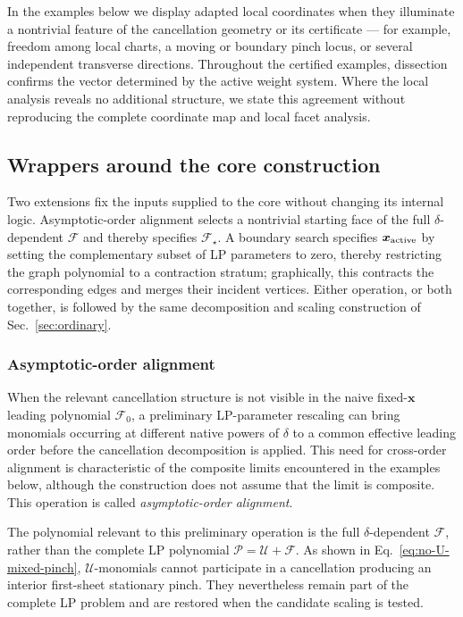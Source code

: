 \documentclass[a4paper,11pt]{article}
\newcommand{\x}{\boldsymbol{x}}
\begin{document}
In the examples below we display adapted local coordinates when they
illuminate a nontrivial feature of the cancellation geometry or its
certificate --- for example, freedom among local charts, a moving or boundary
pinch locus, or several independent transverse directions.  Throughout the
certified examples, dissection confirms the vector determined by the active
weight system.  Where the local analysis reveals no additional structure,
we state this agreement without reproducing the complete coordinate map and
local facet analysis.

\subsection{Wrappers around the core construction}
\label{sec:alignment}

Two extensions fix the inputs supplied to the core without changing its
internal logic.  Asymptotic-order alignment selects a nontrivial starting
face of the full \(\delta\)-dependent \(\mathcal F\) and thereby specifies
\(\mathcal F_\star\).  A boundary search specifies \(\x_{\rm active}\) by
setting the complementary subset of LP parameters to zero, thereby
restricting the graph polynomial to a contraction stratum; graphically, this
contracts the corresponding edges and merges their incident vertices.  Either
operation, or both together, is followed by the same decomposition and
scaling construction of Sec.~\ref{sec:ordinary}.

\subsubsection{Asymptotic-order alignment}

When the relevant cancellation structure is not visible in the naive
fixed-\(\x\) leading polynomial \(\mathcal F_0\), a preliminary LP-parameter
rescaling can bring monomials occurring at different native powers of
\(\delta\) to a common effective leading order before the cancellation
decomposition is applied.  This need for cross-order alignment is
characteristic of the composite limits encountered in the examples below,
although the construction does not assume that the limit is composite.  This
operation is called
\emph{asymptotic-order alignment}.

The polynomial relevant to this preliminary operation is the full
\(\delta\)-dependent \(\mathcal F\), rather than the complete LP polynomial
\(\mathcal P=\mathcal U+\mathcal F\).  As shown in
Eq.~\eqref{eq:no-U-mixed-pinch}, \(\mathcal U\)-monomials cannot participate in
a cancellation producing an interior first-sheet stationary pinch.  They
nevertheless remain part of the complete LP problem and are restored when the
candidate scaling is tested.
\end{document}
